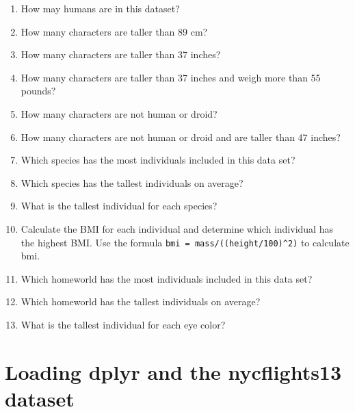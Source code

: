 \documentclass[
]{book}
\providecommand{\tightlist}{%
  \setlength{\itemsep}{0pt}\setlength{\parskip}{0pt}}
\begin{document}
\begin{enumerate}
\def\labelenumi{\arabic{enumi}.}
\tightlist
\item
  How may humans are in this dataset?
\item
  How many characters are taller than 89 cm?
\item
  How many characters are taller than 37 inches?
\item
  How many characters are taller than 37 inches and weigh more than 55 pounds?
\item
  How many characters are not human or droid?
\item
  How many characters are not human or droid and are taller than 47 inches?
\item
  Which species has the most individuals included in this data set?
\item
  Which species has the tallest individuals on average?
\item
  What is the tallest individual for each species?
\item
  Calculate the BMI for each individual and determine which individual has the highest BMI. Use the formula \texttt{bmi\ =\ mass/((height/100)\^{}2)} to calculate bmi.
\item
  Which homeworld has the most individuals included in this data set?
\item
  Which homeworld has the tallest individuals on average?
\item
  What is the tallest individual for each eye color?
\end{enumerate}

\hypertarget{loading-dplyr-and-the-nycflights13-dataset}{%
\chapter{Loading dplyr and the nycflights13 dataset}\label{loading-dplyr-and-the-nycflights13-dataset}}
\end{document}
